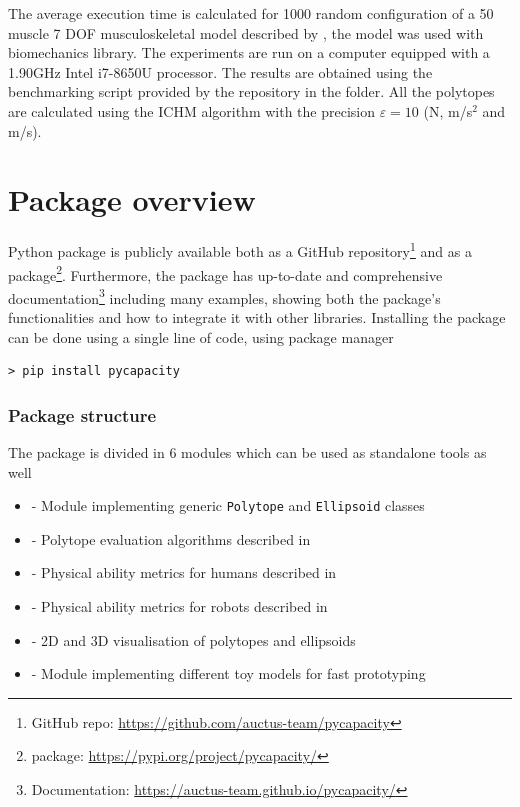 The average execution time is calculated for 1000 random configuration of a 50 muscle 7 DOF musculoskeletal model described by \citet{holzbaur2005model}, the model was used with  \cite{Michaud2021} biomechanics library. The experiments are run on a computer equipped with a 1.90GHz Intel i7-8650U processor. The results are obtained using the benchmarking script provided by the repository in the  folder. All the polytopes are calculated using the ICHM 
algorithm with the precision $\varepsilon=10$ (N, m/s$^2$ and m/s). 


{
\section{Package overview}
\label{sec:pycapacity_package_overview}
Python package  is publicly available both as a GitHub repository\footnote{GitHub repo: \url{https://github.com/auctus-team/pycapacity}} and as a  package\footnote{ package: \url{https://pypi.org/project/pycapacity/}}. Furthermore, the package has up-to-date and comprehensive documentation\footnote{Documentation: \url{https://auctus-team.github.io/pycapacity/}} including many examples, showing both the package's functionalities and how to integrate it with other libraries. 
Installing the package can be done using a single line of code, using  package manager 
\begin{verbatim}
> pip install pycapacity
\end{verbatim}
}

\subsubsection*{Package structure}
The package is divided in 6 modules which can be used as standalone tools as well
\begin{itemize}
    \item {} - Module implementing generic \texttt{Polytope} and \texttt{Ellipsoid} classes 
    \item {} - Polytope evaluation algorithms described in  
    \item {} - Physical ability metrics for humans described in 
    \item {} - Physical ability metrics for robots described in 
    \item {} - 2D and 3D visualisation of polytopes and ellipsoids
    \item {} - Module implementing different toy models for fast prototyping
\end{itemize}

